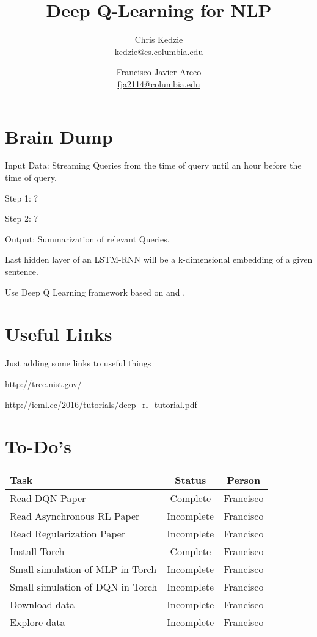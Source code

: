 \documentclass[12pt]{article}
\title{Deep Q-Learning for NLP}
\author{
	Chris Kedzie \\ \href{mailto: kedzie@cs.columbia.edu}{\small kedzie@cs.columbia.edu} 
		\and  
	Francisco Javier Arceo \\ \href{mailto: fja2114@columbia.edu}{\small fja2114@columbia.edu} 
	}
\begin{document}
\maketitle




\section{Brain Dump}

Input Data: Streaming Queries from the time of query until an hour before the time of query. 

Step 1:  ?

Step 2:  ?

Output: Summarization of relevant Queries.

Last hidden layer of an LSTM-RNN will be a k-dimensional embedding of a given sentence. 

Use Deep Q Learning framework based on \cite{MnihKSGAWR13} and \cite{DBLP:journals/corr/MnihBMGLHSK16}.

\section{Useful Links}

Just adding some links to useful things 

\url{http://trec.nist.gov/}

\url{http://icml.cc/2016/tutorials/deep_rl_tutorial.pdf}

\section{To-Do's}
\center
\begin{tabular}{ l | c | c  }
	\hline
	Task  & Status  & Person\\ \hline
  	Read DQN Paper \cite{MnihKSGAWR13}  & Complete  & Francisco \\
	Read Asynchronous RL Paper \cite{DBLP:journals/corr/MnihBMGLHSK16} & Incomplete  & Francisco \\
	Read  Regularization Paper \cite{chen2012marginalized} & Incomplete  & Francisco \\
	Install Torch & Complete  & Francisco \\
	Small simulation of MLP in Torch & Incomplete  & Francisco \\
	Small simulation of DQN in Torch & Incomplete  & Francisco \\
	Download data & Incomplete  & Francisco \\
	Explore data & Incomplete  & Francisco \\
	\hline
\end{tabular}


\end{document}
